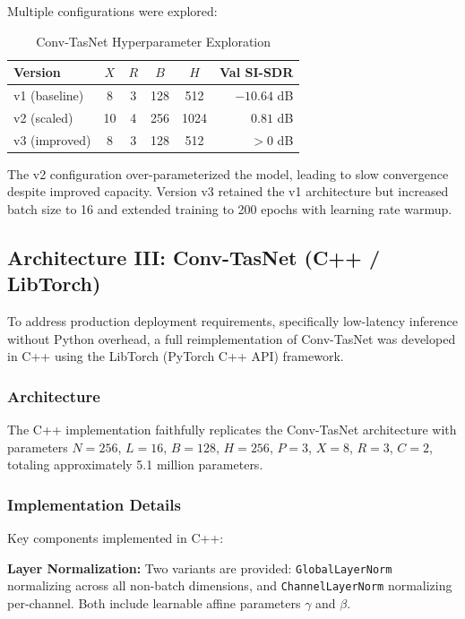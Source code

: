 \documentclass[conference]{IEEEtran}
\begin{document}
Multiple configurations were explored:

\begin{table}[t]
\centering
\caption{Conv-TasNet Hyperparameter Exploration}
\label{tab:convtasnet_hp}
\begin{tabular}{@{}lccccr@{}}
\toprule
\textbf{Version} & $X$ & $R$ & $B$ & $H$ & \textbf{Val SI-SDR} \\
\midrule
v1 (baseline) & 8 & 3 & 128 & 512 & $-10.64$ dB \\
v2 (scaled) & 10 & 4 & 256 & 1024 & $0.81$ dB \\
v3 (improved) & 8 & 3 & 128 & 512 & $>0$ dB \\
\bottomrule
\end{tabular}
\end{table}

The v2 configuration over-parameterized the model, leading to slow convergence despite improved capacity. Version v3 retained the v1 architecture but increased batch size to 16 and extended training to 200 epochs with learning rate warmup.

\subsection{Architecture III: Conv-TasNet (C++ / LibTorch)}
\label{sec:convtasnet_cpp}

To address production deployment requirements, specifically low-latency inference without Python overhead, a full reimplementation of Conv-TasNet was developed in C++ using the LibTorch (PyTorch C++ API) framework.

\subsubsection{Architecture}

The C++ implementation faithfully replicates the Conv-TasNet architecture with parameters $N{=}256$, $L{=}16$, $B{=}128$, $H{=}256$, $P{=}3$, $X{=}8$, $R{=}3$, $C{=}2$, totaling approximately 5.1 million parameters.

\subsubsection{Implementation Details}

Key components implemented in C++:

\textbf{Layer Normalization:} Two variants are provided: \texttt{GlobalLayerNorm} normalizing across all non-batch dimensions, and \texttt{ChannelLayerNorm} normalizing per-channel. Both include learnable affine parameters $\gamma$ and $\beta$.
\end{document}
